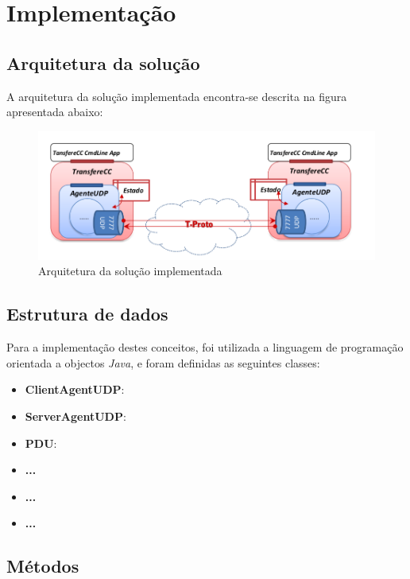 \documentclass{article}
\begin{document}
\newpage









\section{Implementação}

\subsection{Arquitetura da solução}

A arquitetura da solução implementada encontra-se descrita na figura apresentada abaixo:

\begin{figure}[H]
    \centering
    \includegraphics[scale=0.4]{img/arquitetura.PNG}
    \caption{Arquitetura da solução implementada}
\end{figure}


\subsection{Estrutura de dados}

Para a implementação destes conceitos, foi utilizada a linguagem de programação orientada a objectos \emph{Java}, e foram definidas as seguintes classes:
\begin{itemize}
\item \textbf{ClientAgentUDP}:
\item \textbf{ServerAgentUDP}:
\item \textbf{PDU}:
\item \textbf{...}
\item \textbf{...}
\item \textbf{...}
\end{itemize}

\subsection{Métodos}
\end{document}
